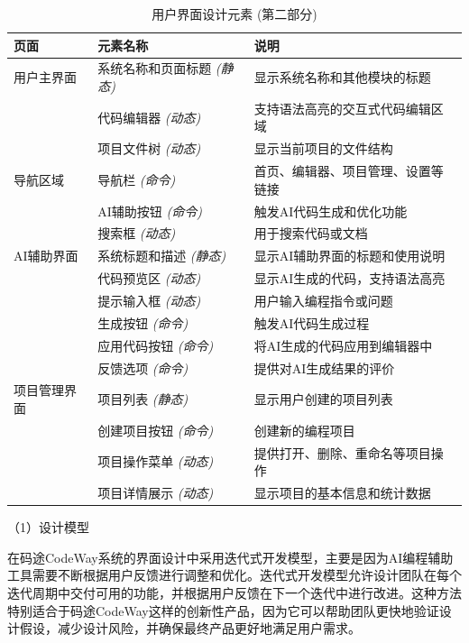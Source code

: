\documentclass[
    report,     %
    oneside,    %
    UTF8,       %
    zihao=-4    %
]{config} %
\begin{document}
\begin{table}[htbp]
\centering
\renewcommand{\arraystretch}{1.3} %
\setlength{\tabcolsep}{8pt} %
\begin{tabular}{|p{2.5cm}|p{4cm}|p{6.5cm}|}
\hline
\textbf{页面} & \textbf{元素名称} & \textbf{说明} \\ \hline
用户主界面 & 系统名称和页面标题 \textit{(静态)} & 显示系统名称和其他模块的标题 \\ \cline{2-3}
 & 代码编辑器 \textit{(动态)} & 支持语法高亮的交互式代码编辑区域 \\ \cline{2-3}
 & 项目文件树 \textit{(动态)} & 显示当前项目的文件结构 \\ \hline
导航区域 & 导航栏 \textit{(命令)} & 首页、编辑器、项目管理、设置等链接 \\ \cline{2-3}
 & AI辅助按钮 \textit{(命令)} & 触发AI代码生成和优化功能 \\ \cline{2-3}
 & 搜索框 \textit{(动态)} & 用于搜索代码或文档 \\ \hline
AI辅助界面 & 系统标题和描述 \textit{(静态)} & 显示AI辅助界面的标题和使用说明 \\ \cline{2-3}
 & 代码预览区 \textit{(动态)} & 显示AI生成的代码，支持语法高亮 \\ \cline{2-3}
 & 提示输入框 \textit{(动态)} & 用户输入编程指令或问题 \\ \cline{2-3}
 & 生成按钮 \textit{(命令)} & 触发AI代码生成过程 \\ \cline{2-3}
 & 应用代码按钮 \textit{(命令)} & 将AI生成的代码应用到编辑器中 \\ \cline{2-3}
 & 反馈选项 \textit{(命令)} & 提供对AI生成结果的评价 \\ \hline
项目管理界面 & 项目列表 \textit{(静态)} & 显示用户创建的项目列表 \\ \cline{2-3}
 & 创建项目按钮 \textit{(命令)} & 创建新的编程项目 \\ \cline{2-3}
 & 项目操作菜单 \textit{(动态)} & 提供打开、删除、重命名等项目操作 \\ \cline{2-3}
 & 项目详情展示 \textit{(动态)} & 显示项目的基本信息和统计数据 \\ \hline
\end{tabular}
\caption{用户界面设计元素 (第二部分)}
\label{tab:ui-elements-2}
\end{table}

（1）设计模型

在码途CodeWay系统的界面设计中采用迭代式开发模型，主要是因为AI编程辅助工具需要不断根据用户反馈进行调整和优化。迭代式开发模型允许设计团队在每个迭代周期中交付可用的功能，并根据用户反馈在下一个迭代中进行改进。这种方法特别适合于码途CodeWay这样的创新性产品，因为它可以帮助团队更快地验证设计假设，减少设计风险，并确保最终产品更好地满足用户需求。
\end{document}

